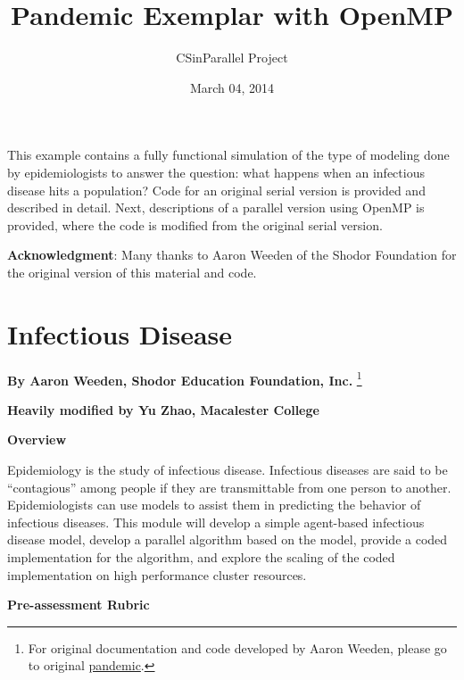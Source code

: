 \documentclass[letterpaper,10pt,openany,oneside]{sphinxmanual}
\title{Pandemic Exemplar with OpenMP}
\date{March 04, 2014}
\author{CSinParallel Project}
\begin{document}
\maketitle
\tableofcontents
{}\label{index::doc}


This example contains a fully functional simulation of the type of modeling done by epidemiologists to answer the question: what happens when an infectious disease hits a population?  Code for an original serial version is provided and described in detail.  Next, descriptions of a parallel version using OpenMP is provided, where the code is modified from the original serial version.

\textbf{Acknowledgment}: Many thanks to Aaron Weeden of the Shodor Foundation for the original version of this material and code.


\chapter{Infectious Disease}
\label{0-Introduction/introduction:pandemic-modeling-exemplar-using-openmp}\label{0-Introduction/introduction:infectious-disease}\label{0-Introduction/introduction::doc}
\textbf{By Aaron Weeden, Shodor Education Foundation, Inc.} \footnote{
For original documentation and code developed by Aaron Weeden, please go to original \href{http://www.shodor.org/petascale/materials/UPModules/infectiousDisease/}{pandemic}.
}

\textbf{Heavily modified by Yu Zhao, Macalester College}

\textbf{Overview}

Epidemiology is the study of infectious disease. Infectious diseases are
said to be “contagious” among people if they are transmittable from one
person to another. Epidemiologists can use models to assist them in
predicting the behavior of infectious diseases. This module will develop
a simple agent-based infectious disease model, develop a parallel
algorithm based on the model, provide a coded implementation for the
algorithm, and explore the scaling of the coded implementation on high
performance cluster resources.

\textbf{Pre-assessment Rubric}
\end{document}
